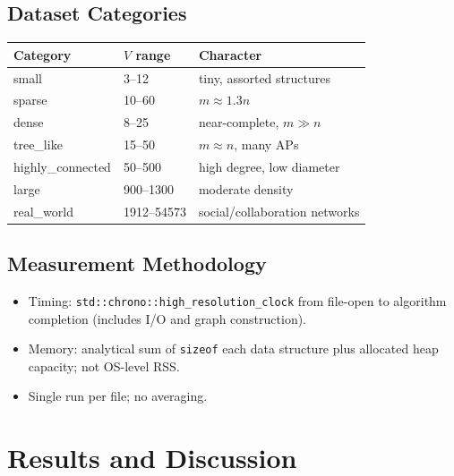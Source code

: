 \documentclass[12pt,a4paper]{article}
\newcommand{\code}[1]{\texttt{#1}}
\begin{document}
\subsection{Dataset Categories}

\begin{center}
\begin{tabular}{|l|l|l|}
\hline
\textbf{Category} & \textbf{$V$ range} & \textbf{Character} \\ \hline
small             & 3--12        & tiny, assorted structures \\ \hline
sparse            & 10--60       & $m \approx 1.3n$ \\ \hline
dense             & 8--25        & near-complete, $m \gg n$ \\ \hline
tree\_like        & 15--50       & $m \approx n$, many APs \\ \hline
highly\_connected & 50--500      & high degree, low diameter \\ \hline
large             & 900--1300    & moderate density \\ \hline
real\_world       & 1912--54573  & social/collaboration networks \\ \hline
\end{tabular}
\end{center}

\subsection{Measurement Methodology}

\begin{itemize}
    \item Timing: \code{std::chrono::high\_resolution\_clock} from file-open
          to algorithm completion (includes I/O and graph construction).
    \item Memory: analytical sum of \code{sizeof} each data structure plus
          allocated heap capacity; not OS-level RSS.
    \item Single run per file; no averaging.
\end{itemize}


\section{Results and Discussion}
\end{document}
